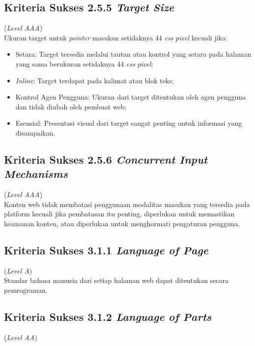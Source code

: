 \subsection{Kriteria Sukses 2.5.5 \textit{Target Size}}
\label{subsec:kriteria_2.5.5}
(\textit{Level AAA}) \\

Ukuran target untuk \textit{pointer} masukan setidaknya 44 \textit{css} \textit{pixel} kecuali jika:

\begin{itemize}
	\item Setara: Target tersedia melalui tautan atau kontrol yang setara pada halaman yang sama berukuran setidaknya 44 \textit{css} \textit{pixel};
	\item \textit{Inline}: Target terdapat pada kalimat atau blok teks;
	\item Kontrol Agen Pengguna: Ukuran dari target ditentukan oleh agen pengguna dan tidak diubah oleh pembuat web;
	\item Esensial: Presentasi visual dari target sangat penting untuk informasi yang disampaikan.
\end{itemize}

\subsection{Kriteria Sukses 2.5.6 \textit{Concurrent Input Mechanisms}}
\label{subsec:kriteria_2.5.6}
(\textit{Level AAA}) \\

Konten web tidak membatasi penggunaan modalitas masukan yang tersedia pada platform kecuali jika pembatasan itu penting, diperlukan untuk memastikan keamanan konten, atau diperlukan untuk menghormati pengaturan pengguna.

\subsection{Kriteria Sukses 3.1.1 \textit{Language of Page}}
\label{subsec:kriteria_3.1.1}
(\textit{Level A}) \\

Standar bahasa manusia dari setiap halaman web dapat ditentukan secara pemrograman.

\subsection{Kriteria Sukses 3.1.2 \textit{Language of Parts}}
\label{subsec:kriteria_3.1.2}
(\textit{Level AA}) \\

